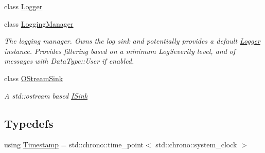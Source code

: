 \begin{DoxyCompactItemize}
class \mbox{\hyperlink{classonnxruntime_1_1logging_1_1Logger}{Logger}}
\item 
class \mbox{\hyperlink{classonnxruntime_1_1logging_1_1LoggingManager}{Logging\+Manager}}
\begin{DoxyCompactList}\small\item\em The logging manager. Owns the log sink and potentially provides a default \mbox{\hyperlink{classonnxruntime_1_1logging_1_1Logger}{Logger}} instance. Provides filtering based on a minimum Log\+Severity level, and of messages with Data\+Type\+::\+User if enabled. \end{DoxyCompactList}\item 
class \mbox{\hyperlink{classonnxruntime_1_1logging_1_1OStreamSink}{O\+Stream\+Sink}}
\begin{DoxyCompactList}\small\item\em A std\+::ostream based \mbox{\hyperlink{classonnxruntime_1_1logging_1_1ISink}{I\+Sink}} \end{DoxyCompactList}\end{DoxyCompactItemize}
\subsection*{Typedefs}
\begin{DoxyCompactItemize}
\item 
using \mbox{\hyperlink{namespaceonnxruntime_1_1logging_ae7a2a84f622a028e2ad495a74289012d}{Timestamp}} = std\+::chrono\+::time\+\_\+point$<$ std\+::chrono\+::system\+\_\+clock $>$
\end{DoxyCompactItemize}
